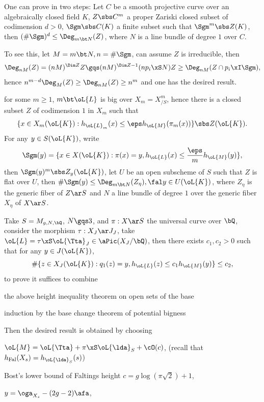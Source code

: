 \documentclass[a4paper, twoside]{article}
\begin{document}
\begin{prf}
	One can prove in two steps:
	 Let $C$ be a smooth projective curve over an algebraically closed field $K$, $Z\sbs C^{m}$ a proper Zariski closed subset of codimension $d>0$, $\Sgm\sbs C(K)$ a finite subset such that $\Sgm^{m}\sbs Z(K)$, then $(\#\Sgm)^{d}\leq\Deg_{m\bt N}(Z)$, where $N$ is a line bundle of degree $1$ over $C$.

	To see this, let $M=m\bt N, n=\#\Sgm$, can assume $Z$ is irreducible, then
	\[
		\Deg_{nM}(Z)=(nM)^{\Dim Z}Z\gqs(nM)^{\Dim Z-1}(np_{i}\xS N)Z\geq\Deg_{nM}(Z\cap p_{i}\xI\Sgm),
	\]
	hence $n^{m-d}\Deg_{M}(Z)\geq\Deg_{nM}(Z)\geq n^{m}$ and one has the desired result.

	 for some $m\geq1$, $m\bt\oL{L}$ is big over $X_{m}=X_{/S}^{m}$, hence there is a closed subset $Z$ of codimension $1$ in $X_{m}$ such that
	\[
		\{x\in X_{m}(\oL{K}):h_{\oL{L}_{m}}(x)\leq\eps h_{\oL{M}}(\pi_{m}(x))\}\sbs Z(\oL{K}).
	\]
	For any $y\in S(\oL{K})$, write
	\[
		\Sgm(y)=\{x\in X(\oL{K}):\pi(x)=y,h_{\oL{L}}(x)\leq\frac{\eps}{m}h_{\oL{M}}(y)\},
	\]
	then $\Sgm(y)^{m}\sbs Z_{y}(\oL{K})$, let $U$ be an open subscheme of $S$ such that $Z$ is flat over $U$, then $\#\Sgm(y)\leq\Deg_{m\bt N}(Z_{\eta}),\fal y\in U(\oL{K})$, where $Z_{\eta}$ is the generic fiber of $Z\ar S$ and $N$ a line bundle of degree $1$ over the generic fiber $X_{\eta}$ of $X\ar S$.
\end{prf}


Take $S=M_{g,N,\bQ}$, $N\gqs3$, and $\pi:X\ar S$ the universal curve over $\bQ$, consider the morphism $\tau:X_{J}\ar J_{J}$, take $\oL{L}=\tau\xS\oL{\Tta}_{J}\in\aPic(X_{J}/\bQ)$, then there exists $c_{1},c_{2}>0$ such that for any $y\in J(\oL{K})$,
\[
	\#\{z\in X_{J}(\oL{K}):q_{1}(z)=y, h_{\oL{L}}(z)\leq c_{1}h_{\oL{M}}(y)\}\leq c_{2},
\]
to prove it suffices to combine
\begin{enr}
	\item the above height inequality theorem on open sets of the base
	\item induction by the base change theorem of potential bigness
\end{enr}
Then the desired result is obtained by choosing
\begin{enr}
	\item $\oL{M}=\oL{\Tta}+\pi\xS\oL{\lda}_{S}+\cO(c)$, (recall that $h_{\mathrm{Fal}}(X_{s})=h_{\oL{\lda}_{S}}(s)$)
	\item Bost's lower bound of Faltings height $c=g\log(\pi\sqrt{2})+1$,
	\item $y=\oga_{X_{s}}-(2g-2)\afa$,
\end{enr}
\end{document}
